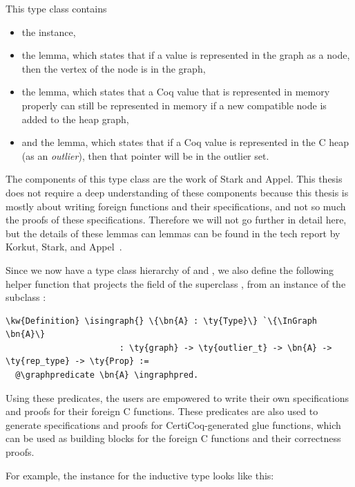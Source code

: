 This type class contains
\begin{itemize}
\item the \GraphPredicate{} instance,
\item the \hasv{} lemma, which states that if a value is represented in the graph as a node, then the vertex of the node is in the graph,
\item the \ismonotone{} lemma, which states that a Coq value that is represented in memory properly can still be represented in memory if a new compatible node is added to the heap graph,
\item and the \outliercompat{} lemma, which states that if a Coq value is represented in the \gls{C heap} (as an \emph{outlier}), then that pointer will be in the outlier set.
\end{itemize}
The components of this type class are the work of Stark and Appel. This thesis does not require a deep understanding of these components because this thesis is mostly about writing foreign functions and their specifications, and not so much the proofs of these specifications. Therefore we will not go further in detail here, but the details of these lemmas can lemmas can be found in the tech report by Korkut, Stark, and Appel~\cite{korkutStarkAppel}.

Since we now have a type class hierarchy of \GraphPredicate{} and \InGraph{}, we also define the following helper function that projects the \graphpredicate{} field of the superclass \GraphPredicate{}, from an instance of the subclass \InGraph{}:

\newcommand{\isingraph}{\hyperref[code:isingraph]{\fn{is\_\linebreak[0]in\_\linebreak[0]graph}}}
\label{code:isingraph}
\begin{Verbatim}
\kw{Definition} \isingraph{} \{\bn{A} : \ty{Type}\} `\{\InGraph \bn{A}\}
                       : \ty{graph} -> \ty{outlier_t} -> \bn{A} -> \ty{rep_type} -> \ty{Prop} :=
  @\graphpredicate \bn{A} \ingraphpred.
\end{Verbatim}


Using these predicates, the users are empowered to write their own specifications and proofs for their foreign C functions. These predicates are also used to generate specifications and proofs for CertiCoq-generated glue functions, which can be used as building blocks for the foreign C functions and their correctness proofs.

For example, the \GraphPredicate{} instance for the \Vec{} inductive type looks like this:

